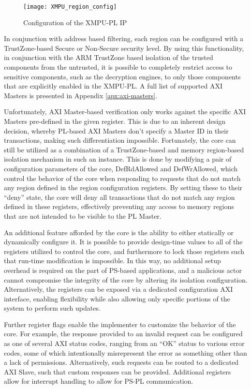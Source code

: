 \begin{figure}[ht]
    \centering
    \texttt{[image: XMPU\_region\_config]}
    \caption[XMPU Region Configuration]{Configuration of the XMPU-PL IP}
    \label{fig:XMPU_region_config}
\end{figure}

In conjunction with address based filtering, each region can be configured with a TrustZone-based Secure or Non-Secure security level. By using this functionality, in conjunction with the ARM TrustZone based isolation of the trusted components from the untrusted, it is possible to completely restrict access to sensitive components, such as the decryption engines, to only those components that are explicitly enabled in the XMPU-PL. A full list of supported AXI Masters is presented in Appendix \ref{apx:axi-masters}.

Unfortunately, AXI Master-based verification only works against the specific AXI Masters pre-defined in the given register. This is due to an inherent design decision, whereby PL-based AXI Masters don't specify a Master ID in their transactions, making such differentiation impossible. Fortunately, the core can still be utilized as a combination of a TrustZone-based and memory region-based isolation mechanism in such an instance. This is done by modifying a pair of configuration parameters of the core, DefRdAllowed and DefWrAllowed, which control the behavior of the core when responding to requests that do not match any region defined in the region configuration registers. By setting these to their ``deny'' state, the core will deny all transactions that do not match any region defined in these registers, effectively preventing any access to memory regions that are not intended to be visible to the PL Master.

An additional feature afforded by the core is the ability to either statically or dynamically configure it. It is possible to provide design-time values to all of the registers utilized to control the core, and furthermore to lock those registers such that run-time modification is impossible. In this way, no additional setup overhead is required on the part of PS-based applications, and a malicious actor cannot compromise the integrity of the core by altering its isolation configuration. Alternatively, the registers can be exposed via a dedicated configuration AXI interface, enabling flexibility while also allowing only specific portions of the system to perform such updates.

Further register flags enable the implementer to customize the behavior of the core. For example, the response provided to an invalid request can be configured as one of several AXI status codes, ranging from an ``OK'' status to various error codes, some of which intentionally misrepresent the error as something other than a lack of permissions. Alternatively, such requests can be routed to a dedicated AXI Slave, such that custom responses can be provided. Additional registers allow for interrupt handling to allow for PS-PL communication.


